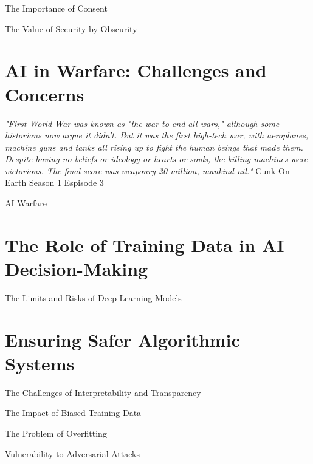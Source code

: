 The Importance of Consent

The Value of Security by Obscurity

\section{AI in Warfare: Challenges and Concerns}

\textit{"First World War was known as "the war to end all wars," although some historians now argue it didn't. But it was the first high-tech war, with aeroplanes, machine guns and tanks all rising up to fight the human beings that made them. Despite having no beliefs or ideology or hearts or souls, the killing machines were victorious. The final score was weaponry 20 million, mankind nil."} Cunk On Earth Season 1 Espisode 3 \cite{cunkonearth}

AI Warfare \cite{aiwarfare}

\section{The Role of Training Data in AI Decision-Making}

The Limits and Risks of Deep Learning Models

\section{Ensuring Safer Algorithmic Systems}

\cite{saferalgorithmicsystems}

The Challenges of Interpretability and Transparency

The Impact of Biased Training Data

The Problem of Overfitting

Vulnerability to Adversarial Attacks

